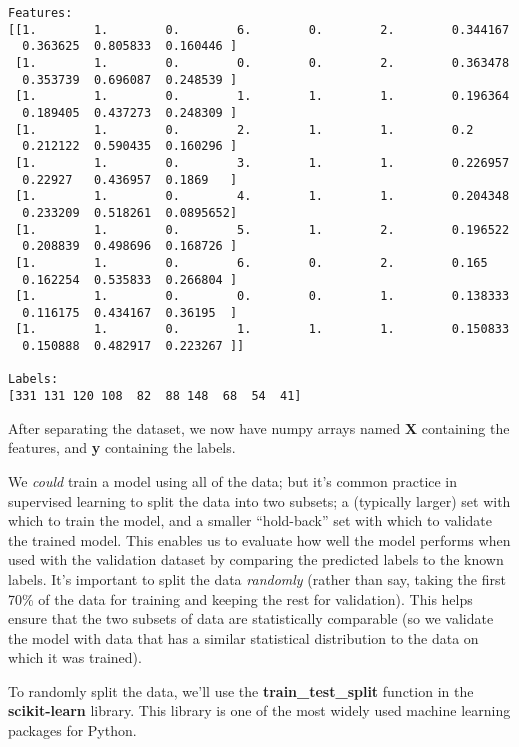 \documentclass[11pt]{article}
\begin{document}
    \begin{Verbatim}[commandchars=\\\{\}]
Features:
[[1.        1.        0.        6.        0.        2.        0.344167
  0.363625  0.805833  0.160446 ]
 [1.        1.        0.        0.        0.        2.        0.363478
  0.353739  0.696087  0.248539 ]
 [1.        1.        0.        1.        1.        1.        0.196364
  0.189405  0.437273  0.248309 ]
 [1.        1.        0.        2.        1.        1.        0.2
  0.212122  0.590435  0.160296 ]
 [1.        1.        0.        3.        1.        1.        0.226957
  0.22927   0.436957  0.1869   ]
 [1.        1.        0.        4.        1.        1.        0.204348
  0.233209  0.518261  0.0895652]
 [1.        1.        0.        5.        1.        2.        0.196522
  0.208839  0.498696  0.168726 ]
 [1.        1.        0.        6.        0.        2.        0.165
  0.162254  0.535833  0.266804 ]
 [1.        1.        0.        0.        0.        1.        0.138333
  0.116175  0.434167  0.36195  ]
 [1.        1.        0.        1.        1.        1.        0.150833
  0.150888  0.482917  0.223267 ]]

Labels:
[331 131 120 108  82  88 148  68  54  41]
    \end{Verbatim}

    After separating the dataset, we now have numpy arrays named \textbf{X}
containing the features, and \textbf{y} containing the labels.

We \emph{could} train a model using all of the data; but it's common
practice in supervised learning to split the data into two subsets; a
(typically larger) set with which to train the model, and a smaller
``hold-back'' set with which to validate the trained model. This enables
us to evaluate how well the model performs when used with the validation
dataset by comparing the predicted labels to the known labels. It's
important to split the data \emph{randomly} (rather than say, taking the
first 70\% of the data for training and keeping the rest for
validation). This helps ensure that the two subsets of data are
statistically comparable (so we validate the model with data that has a
similar statistical distribution to the data on which it was trained).

To randomly split the data, we'll use the \textbf{train\_test\_split}
function in the \textbf{scikit-learn} library. This library is one of
the most widely used machine learning packages for Python.
\end{document}
